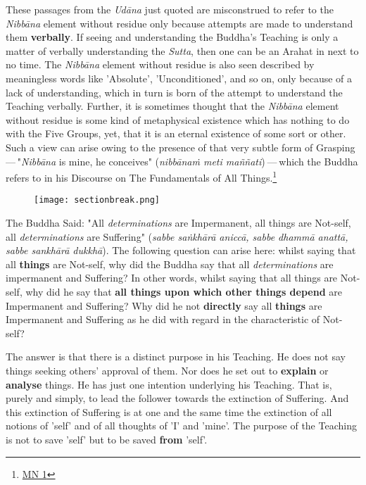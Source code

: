 These passages from the \emph{Udāna} just quoted are misconstrued to refer to
the \emph{Nibbāna} element without residue only because attempts are made to
understand them \textbf{verbally}. If seeing and understanding the Buddha’s
Teaching is only a matter of verbally understanding the \emph{Sutta}, then
one can be an Arahat in next to no time. The \emph{Nibbāna} element without
residue is also seen described by meaningless words like 'Absolute',
'Unconditioned', and so on, only because of a lack of understanding,
which in turn is born of the attempt to understand the Teaching
verbally. Further, it is sometimes thought that the \emph{Nibbāna} element
without residue is some kind of metaphysical existence which has nothing
to do with the Five Groups, yet, that it is an eternal existence of some
sort or other. Such a view can arise owing to the presence of that very
subtle form of Grasping — "\emph{Nibbāna} is mine, he conceives"
(\emph{nibbānaṁ meti maññati}) — which the Buddha refers to in his
Discourse on The Fundamentals of All Things.\footnote{\href{https://suttacentral.net/mn1/en/bodhi}{MN 1}}


\begin{figure}[h]{}
\centering\texttt{[image: sectionbreak.png]}


\end{figure}

The Buddha Said: "All \emph{determinations} are Impermanent, all things are
Not-self, all \emph{determinations} are Suffering" (\emph{sabbe saṅkhārā aniccā,
sabbe dhammā anattā, sabbe sankhārā dukkhā}). The following question
can arise here: whilst saying that all \textbf{things} are Not-self, why did
the Buddha say that all \emph{determinations} are impermanent and Suffering?
In other words, whilst saying that all things are Not-self, why did he
say that \textbf{all things upon which other things depend} are Impermanent and
Suffering? Why did he not \textbf{directly} say all \textbf{things} are Impermanent
and Suffering as he did with regard in the characteristic of Not-self?


The answer is that there is a distinct purpose in his Teaching. He does
not say things seeking others' approval of them. Nor does he set out to
\textbf{explain} or \textbf{analyse} things. He has just one intention underlying his
Teaching. That is, purely and simply, to lead the follower towards the
extinction of Suffering. And this extinction of Suffering is at one and
the same time the extinction of all notions of 'self' and of all
thoughts of 'I' and 'mine'. The purpose of the Teaching is not to save
'self' but to be saved \textbf{from} 'self'.


